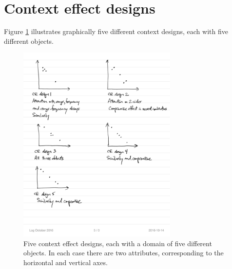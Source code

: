 \documentclass[11pt,letter]{amsart}
\begin{document}
\appendix

\pagebreak

\section{Context effect designs}

\label{s:CEdesigns}

Figure \ref{f:CEdesigns} illustrates graphically five different context
designs, each with five different objects.

\begin{figure}[tbp]
\caption{Five context effect designs, each with a domain of five different
objects. In each case there are two attributes, corresponding to the
horizontal and vertical axes.}
\label{f:CEdesigns}
\includegraphics[height=10cm]{CEdesigns.pdf}
\end{figure}

\end{document}
